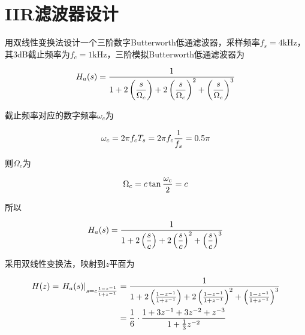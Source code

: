 \documentclass[cn, hazy, blue, normal, 12pt]{elegantnote}
\begin{document}
\section{IIR滤波器设计}

\begin{exercise}

用双线性变换法设计一个三阶数字Butterworth低通滤波器，采样频率$f_s=4\text{kHz}$，其3dB截止频率为$f_c=1\text{kHz}$，三阶模拟Butterworth低通滤波器为

\begin{equation}
\notag
    H_a(s)=\dfrac{1}{1+2\left(\dfrac{s}{\Omega_c}\right)+2\left(\dfrac{s}{\Omega_c}\right)^2+\left(\dfrac{s}{\Omega_c}\right)^3}
\end{equation}

\end{exercise}

\begin{solution}[print=true]

截止频率对应的数字频率$\omega_c$为

\begin{equation}
\notag
    \omega_c=2\pi  f_c T_s=2\pi f_c\dfrac{1}{f_s}=0.5\pi
\end{equation}

则$\Omega_c$为

\begin{equation}
\notag
    \Omega_c=c\tan\dfrac{\omega_c}{2}=c
\end{equation}

所以

\begin{equation}
\notag
    H_a(s)=\dfrac{1}{1+2\left(\dfrac{s}{c}\right)+2\left(\dfrac{s}{c}\right)^2+\left(\dfrac{s}{c}\right)^3}
\end{equation}

采用双线性变换法，映射到$z$平面为

\begin{equation}
\notag
\begin{aligned}
    H(z)=\left.H_a(s)\right|_{s=c\frac{1-z^{-1}}{1+z^{-1}}}&=\dfrac{1}{1+2\left(\frac{1-z^{-1}}{1+z^{-1}}\right)+2\left(\frac{1-z^{-1}}{1+z^{-1}}\right)^2+\left(\frac{1-z^{-1}}{1+z^{-1}}\right)^3} \\
    &=\frac{1}{6}\cdot\frac{1+3z^{-1}+3z^{-2}+z^{-3}}{1+\frac{1}{3}z^{-2}}
\end{aligned}
\end{equation}

\end{solution}
\end{document}

